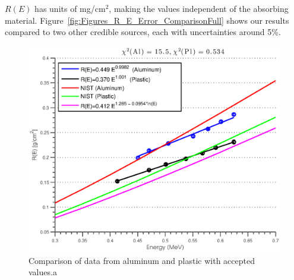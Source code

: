  $R(E)$ has units of mg/cm$^2$, making the values independent of the absorbing material. Figure~\ref{fig:Figures_R_E_Error_ComparisonFull} shows our results compared to two other credible sources\cite{RevModPhys.24.28,nistData}, each with uncertainties around 5\%.  

\begin{figure}[htbp]
  \centering 
  \includegraphics[width=\MyWidth]{Figures/alum_plas_NIST_plot.eps}
  \caption{Comparison of data from aluminum and plastic with accepted values.a}
  \label{fig:Figures_alum_plas_NIST_plot}
\end{figure}%


